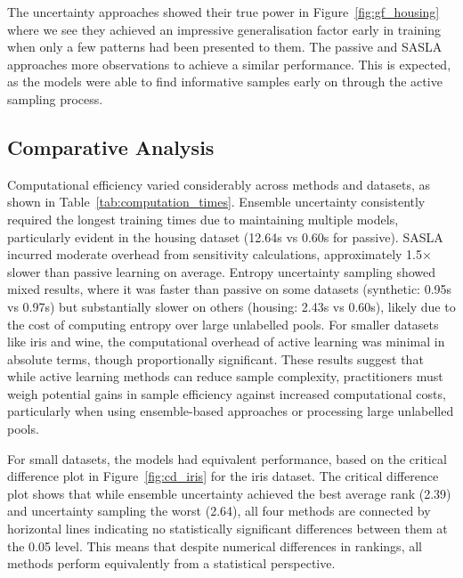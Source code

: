 \documentclass[10pt, conference]{IEEEtran}
\begin{document}
The uncertainty approaches showed their true power in Figure~\ref{fig:gf_housing} where we see they achieved an impressive generalisation factor early in training when only a few patterns had been presented to them. The passive and SASLA approaches more observations to achieve a similar performance. This is expected, as the models were able to find informative samples early on through the active sampling process.

\subsection{Comparative Analysis}

Computational efficiency varied considerably across methods and datasets, as shown in Table~\ref{tab:computation_times}. Ensemble uncertainty consistently required the longest training times due to maintaining multiple models, particularly evident in the housing dataset (12.64s vs 0.60s for passive). SASLA incurred moderate overhead from sensitivity calculations, approximately 1.5× slower than passive learning on average. Entropy uncertainty sampling showed mixed results, where it was faster than passive on some datasets (synthetic: 0.95s vs 0.97s) but substantially slower on others (housing: 2.43s vs 0.60s), likely due to the cost of computing entropy over large unlabelled pools. For smaller datasets like iris and wine, the computational overhead of active learning was minimal in absolute terms, though proportionally significant. These results suggest that while active learning methods can reduce sample complexity, practitioners must weigh potential gains in sample efficiency against increased computational costs, particularly when using ensemble-based approaches or processing large unlabelled pools.

For small datasets, the models had equivalent performance, based on the critical difference plot in Figure~\ref{fig:cd_iris} for the iris dataset. The critical difference plot shows that while ensemble uncertainty achieved the best average rank (2.39) and uncertainty sampling the worst (2.64), all four methods are connected by horizontal lines indicating no statistically significant differences between them at the 0.05 level. This means that despite numerical differences in rankings, all methods perform equivalently from a statistical perspective. 
\end{document}
